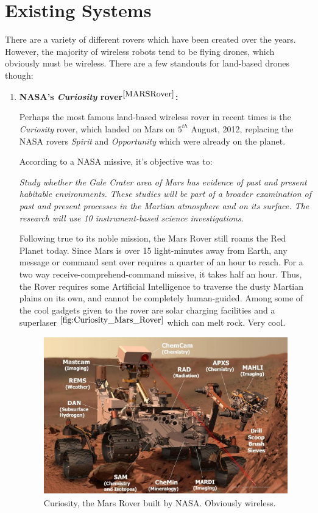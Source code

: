 \section{Existing Systems}

There are a variety of different rovers which have been created over the years. However, the majority of wireless robots tend to be flying drones, which obviously must be wireless. There are a few standouts for land-based drones though:

\begin{enumerate}
	\item \textbf{NASA's \textit{Curiosity} rover${}^{\cite{MARSRover}}$:}
	
		Perhaps the most famous land-based wireless rover in recent times is the \textit{Curiosity} rover, which landed on Mars on $5^{th}$ August, 2012, replacing the NASA rovers \textit{Spirit} and \textit{Opportunity} which were already on the planet. 
		
		According to a NASA missive, it's objective was to:
		
		\begin{displayquote}
			\textit{Study whether the Gale Crater area of Mars has evidence of past and present habitable environments. These studies will be part of a broader examination of past and present processes in the Martian atmosphere and on its surface. The research will use 10 instrument-based science investigations.}
		\end{displayquote}
		
		Following true to its noble mission, the Mars Rover still roams the Red Planet today. Since Mars is over 15 light-minutes away from Earth, any message or command sent over requires a quarter of an hour to reach. For a two way receive-comprehend-command missive, it takes half an hour. Thus, the Rover requires some Artificial Intelligence to traverse the dusty Martian plains on its own, and cannot be completely human-guided. Among some of the cool gadgets given to the rover are solar charging facilities and a superlaser ${}^{\ref{fig:Curiosity_Mars_Rover}}$ which can melt rock. Very cool.
		
		\begin{figure}
			\centering
			\includegraphics[width=0.7\linewidth]{"Curiosity_Mars_Rover.bmp"}
			\caption{Curiosity, the Mars Rover built by NASA. Obviously wireless.}
			\label{fig:Curiosity_Mars_Rover}
		\end{figure}


\end{enumerate}